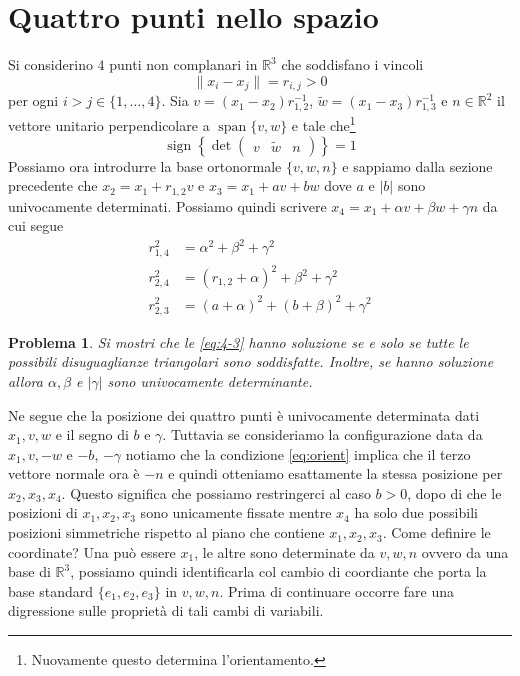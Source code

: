 \documentclass{amsart}
\numberwithin{equation}{section}
\newtheorem{pro}{Problema}
\newcommand\bR{{\mathbb R}}
\newcommand{\spa}{\operatorname{span}}
\begin{document}
\section{Quattro punti nello spazio}
Si considerino $4$ punti non complanari in $\bR^3$ che soddisfano i vincoli
\begin{equation}\label{eq:vincoli0}
\|x_i-x_j\|=r_{i,j}>0
\end{equation}
per ogni $i>j\in \{1,\dots, 4\}$. Sia $v=(x_1- x_2) r_{1,2}^{-1}$, $\tilde w=(x_1- x_3) r_{1,3}^{-1}$ e $n\in\bR^2$ il vettore unitario perpendicolare a $\spa\{v,w\}$ e tale che\footnote{ Nuovamente questo determina l'orientamento.}
\begin{equation}\label{eq:orient}
\operatorname{sign}\left\{\det\begin{pmatrix} v&\tilde w &n\end{pmatrix}\right\}=1
\end{equation}
Possiamo ora introdurre la base ortonormale $\{v,w,n\}$ e sappiamo dalla sezione precedente che $x_2=x_1+r_{1,2} v$ e $x_3=x_1+av+bw$ dove $a$ e $|b|$ sono univocamente determinati. Possiamo quindi scrivere $x_4=x_1+\alpha v+\beta w+\gamma n$ da cui segue
\begin{equation}\label{eq:4-3}
\begin{split}
r_{1,4}^2&=\alpha^2+\beta^2+\gamma^2\\
r_{2,4}^2&=(r_{1,2}+\alpha)^2+\beta^2+\gamma^2\\
r_{2,3}^2&=(a+\alpha)^2+(b+\beta)^2+\gamma^2
\end{split}
\end{equation}
\begin{pro}
Si mostri che le \eqref{eq:4-3} hanno soluzione se e solo se tutte le possibili disuguaglianze triangolari sono soddisfatte. Inoltre, se hanno soluzione allora $\alpha,\beta$ e $|\gamma|$ sono univocamente determinante.
\end{pro}
Ne segue che la posizione dei quattro punti \`e univocamente determinata dati $x_1,v,w$ e il segno di $b$ e $\gamma$. Tuttavia se consideriamo la configurazione data da $x_1, v, -w$ e $-b$, $-\gamma$ notiamo che la condizione \eqref{eq:orient} implica che il terzo vettore normale ora \`e $-n$ e quindi otteniamo esattamente la stessa posizione per $x_2, x_3, x_4$. Questo significa che possiamo restringerci al caso $b>0$, dopo di che le posizioni di $x_1,x_2,x_3$ sono unicamente fissate mentre $x_4$ ha solo due possibili posizioni simmetriche rispetto al piano che contiene $x_1,x_2,x_3$.
Come definire le coordinate?  Una pu\`o essere $x_1$, le altre sono determinate da $v,w,n$ ovvero da una base di $\bR^3$, possiamo quindi identificarla col cambio di coordiante che porta la base standard $\{e_1,e_2,e_3\}$ in $v,w,n$. Prima di continuare occorre fare una digressione sulle propriet\`a di tali cambi di variabili.
\end{document}
